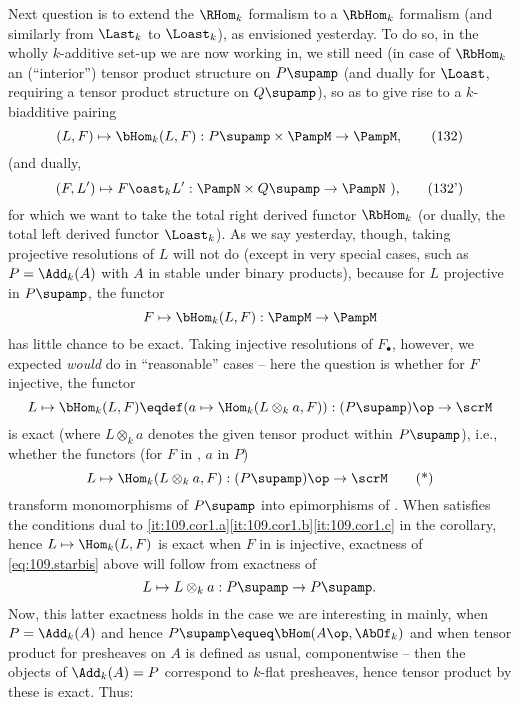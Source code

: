 Next question is to extend the $\RHom_k$ formalism to a $\RbHom_k$
formalism (and similarly from $\Last_k$ to $\Loast_k$), as envisioned
yesterday. To do so, in the wholly $k$-additive set-up we are now
working in, we still need (in case of $\RbHom_k$ an
(``interior'') tensor product structure on $P\supamp$ (and dually for
$\Loast$, requiring a tensor product structure on $Q\supamp$), so as
to give rise to a $k$-biadditive pairing
\begin{equation}
  \label{eq:109.132}
  (L,F)\mapsto\bHom_k(L,F): P\supamp\times\PampM\to\PampM,\tag{132}
\end{equation}
(and dually,
\begin{equation}
  \label{eq:109.132prime}
  (F,L')\mapsto F\oast_kL' : \PampN\times Q\supamp\to\PampN
  \text{ ),}\tag{132'}
\end{equation}
for which we want to take the total right derived functor $\RbHom_k$
(or dually, the total left derived functor $\Loast_k$). As we say
yesterday, though, taking projective resolutions of $L$ will not do
(except in very special cases, such as $P=\Add_k(A)$ with $A$ in
\Cat{} stable under binary products), because for $L$ projective in
$P\supamp$, the functor
\[F\mapsto\bHom_k(L,F):\PampM\to\PampM\]
has little chance to be exact. Taking injective resolutions of
$F_\bullet$, however, we expected \emph{would} do in ``reasonable''
cases -- here the question is whether for $F$ injective, the functor
\[L\mapsto\bHom_k(L,F) \eqdef (a\mapsto\Hom_k(L\otimes_ka,F)) :
(P\supamp)\op\to\scrM\]
is exact (where $L\otimes_ka$ denotes the given tensor product within
$P\supamp$), i.e., whether the functors (for $F$ in \PampM, $a$ in
$P$)
\begin{equation}
  \label{eq:109.starbis}
  L\mapsto\Hom_k(L\otimes_ka,F) : (P\supamp)\op\to\scrM\tag{*}
\end{equation}
transform monomorphisms of $P\supamp$ into epimorphisms of \scrM. When
\scrM{} satisfies the conditions dual to
\ref{it:109.cor1.a}\ref{it:109.cor1.b}\ref{it:109.cor1.c} in the
corollary, hence $L\mapsto\Hom_k(L,F)$ is exact when $F$ in \PampM{}
is injective, exactness of \eqref{eq:109.starbis} above will follow
from exactness of
\[L\mapsto L\otimes_ka : P\supamp\to P\supamp.\]
Now, this latter exactness holds in the case we are interesting in
mainly, when $P=\Add_k(A)$ and hence
$P\supamp\equeq\bHom(A\op,\AbOf_k)$ and when tensor product for
presheaves on $A$ is defined as usual, componentwise -- then the
objects of $\Add_k(A)=P$ correspond to $k$-flat presheaves, hence
tensor product by these is exact. Thus:
